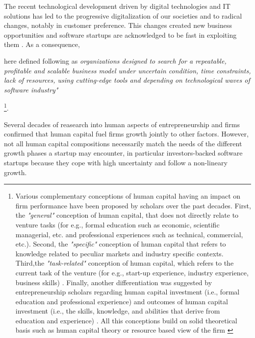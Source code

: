 The recent technological development driven by digital technologies and IT solutions has led to the progressive digitalization of our societies and to radical changes, notably in customer preference. This changes created new business opportunities and software startups are acknowledged to be fast in exploiting them \citep{paternoster2014software, seppanen2016initial}. As a consequence,

here defined following \citet{blank2005four, ries2011lean, unterkalmsteiner2016software} as \textit{organizations designed to search for a repeatable, profitable and scalable business model under uncertain condition, time constraints, lack of resources, using cutting-edge tools and depending on technological waves of software industry"}

\footnote{Various complementary conceptions of human capital having an impact on firm performance have been proposed by scholars over the past decades. First, the \textit{"general"} conception of human capital, that does not directly relate to venture tasks (for e.g., formal education such as economic, scientific managerial, etc. and professional experiences such as technical, commercial, etc.). Second, the \textit{"specific"} conception of human capital that refers to knowledge related to peculiar markets and industry specific contexts. Third,the \textit{"task-related"} conception of human capital, which refers to the current task of the venture (for e.g., start-up experience, industry experience, business skills) \citep{gibbons2004task}. Finally, another differentiation was suggested by entrepreneurship scholars regarding human capital investment (i.e., formal education and professional experience) and outcomes of human capital investment (i.e., the skills, knowledge, and abilities that derive from education and experience) \citep{unger2011human, marvel2016human}. All this conceptions build on solid theoretical basis such as human capital theory \citep{becker1964human} or resource based view of the firm \citep{wernerfelt1984resource, barney1991firm}}.

Several decades of reasearch into human aspects of entrepreneurship and firms confirmed that human capital fuel firms growth jointly to other factors. However, not all human capital compositions necessarily match the needs of the different growth phases a startup may encounter, in particular investors-backed software startups because they cope with high uncertainty and follow a non-lineary growth.


